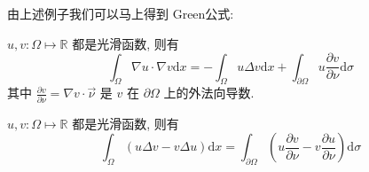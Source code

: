 \documentclass[11pt]{ctexart}[UTF8]
\begin{document}
由上述例子我们可以马上得到 Green公式:
\begin{corollary}[Green第一公式]
    $u, v: \Omega \mapsto \mathbb{R}$ 都是光滑函数, 则有
\begin{equation*}
    \int_{\Omega} \nabla u \cdot \nabla v \mathrm{d}x = - \int_{\Omega} u \Delta v \mathrm{d}x + \int_{\partial \Omega} u \frac{\partial v}{\partial \nu} \mathrm{d}\sigma
\end{equation*} 
其中 $\frac{\partial v}{\partial \nu} = \nabla v \cdot \overrightarrow{\nu}$ 是 $v$ 在 $\partial \Omega$ 上的外法向导数.
\end{corollary}
\begin{corollary}[Green第二公式]
    $u, v: \Omega \mapsto \mathbb{R}$ 都是光滑函数, 则有
\begin{equation*}
    \int_{\Omega} (u \Delta v - v \Delta u) \mathrm{d}x = \int_{\partial \Omega} \left( u \frac{\partial v}{\partial \nu} - v \frac{\partial u}{\partial \nu} \right) \mathrm{d}\sigma
\end{equation*} 
\end{corollary}
\end{document}
